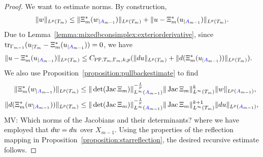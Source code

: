 \documentclass[10pt,letterpaper]{article}
\newcommand{\mwl}[1]{{\color{red}#1}}
\begin{document}
\begin{proof}
    We want to estimate norms. 
    By construction,
    \begin{align*}
        \| w \|_{L^{p}(T_{m})}
        \leq  
        \| \Xi_{m}^{\ast}(w_{|{\color{blue}A}_{m-1}}) \|_{L^{p}(T_{m})}
        + 
        \| u - \Xi_{m}^{\ast}(u_{|{\color{blue}A}_{m-1}}) \|_{L^{p}(T_{m})}
        .
    \end{align*}
    Due to Lemma~\ref{lemma:mixedbconsimplex:exteriorderivative}, since $\operatorname{tr}_{\Gamma_{m-1}} (u_{|T_m} - \Xi_{m}^{\ast}(u_{|{\color{blue}A}_{m-1}})) = 0$, we have
    \begin{align*}
        \| u - \Xi_{m}^{\ast}(u_{|{\color{blue}A}_{m-1}}) \|_{L^{p}(T_{m})} 
        &
        \leq 
        C_{{\rm PF},T_{m},\Gamma_{m},k,p} (\| d u      \|_{L^{p}(T_{m})} 
        + \| d (\Xi_{m}^{\ast}(u_{|{\color{blue}A}_{m-1}})) \|_{L^{p}(T_{m})} )
        .
    \end{align*}
    We also use Proposition~\ref{proposition:pullbackestimate} to find 
    \begin{align*}
        \| \Xi_{m}^{\ast}(w_{|{\color{blue}A}_{m-1}}) \|_{L^{p}(T_{m})}
        &\leq 
        \|\det(\operatorname{{\rm Jac}} \Xi_{m}  )\|^{-\frac 1 p}_{L^{\infty}({\color{blue}A}_{m-1})} 
        \| \operatorname{{\rm Jac}} \Xi_{m} \|^{k}_{L^{\infty}(T_{m})}
        \| w \|_{L^{p}({\color{blue}A}_{m-1})}
        ,
        \\
        \| d (\Xi_{m}^{\ast}(w_{|{\color{blue}A}_{m-1}})) \|_{L^{p}(T_{m})}
        &\leq 
        \|\det(\operatorname{{\rm Jac}} \Xi_{m}  )\|^{-\frac 1 p}_{L^{\infty}({\color{blue}A}_{m-1})} 
        \| \operatorname{{\rm Jac}} \Xi_{m} \|^{k+1}_{L^{\infty}(T_{m})}
        \| d u \|_{L^{p}({\color{blue}A}_{m-1})}
        ,
    \end{align*}
    \mwl{MV: Which norms of the Jacobians and their determinants?}
    where we have employed that $d w = d u$ over $X_{m-1}$. 
    Using the properties of the reflection mapping in Proposition~\ref{proposition:starreflection}, the desired recursive estimate follows. 
\end{proof}
\end{document}
